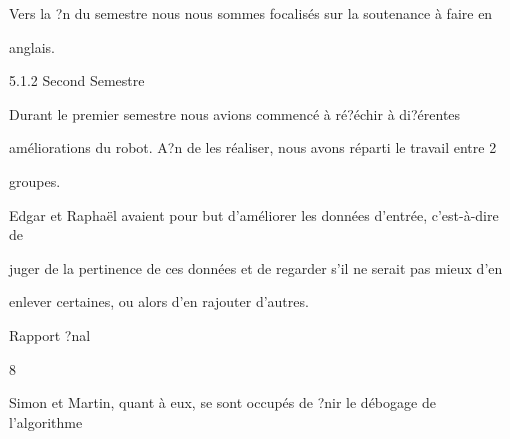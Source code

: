 \documentclass[a4paper,portrait,12pt]{article}
\begin{document}
\begin{flushleft}
Vers la ?n du semestre nous nous sommes focalis\'{e}s sur la soutenance \`{a} faire en
\end{flushleft}


\begin{flushleft}
anglais.
\end{flushleft}





\begin{flushleft}
5.1.2 Second Semestre
\end{flushleft}


\begin{flushleft}
Durant le premier semestre nous avions commenc\'{e} \`{a} r\'{e}?\'{e}chir \`{a} di?\'{e}rentes
\end{flushleft}


\begin{flushleft}
am\'{e}liorations du robot. A?n de les r\'{e}aliser, nous avons r\'{e}parti le travail entre 2
\end{flushleft}


\begin{flushleft}
groupes.
\end{flushleft}


\begin{flushleft}
Edgar et Rapha\"{e}l avaient pour but d'am\'{e}liorer les donn\'{e}es d'entr\'{e}e, c'est-\`{a}-dire de
\end{flushleft}


\begin{flushleft}
juger de la pertinence de ces donn\'{e}es et de regarder s'il ne serait pas mieux d'en
\end{flushleft}


\begin{flushleft}
enlever certaines, ou alors d'en rajouter d'autres.
\end{flushleft}





\begin{flushleft}
\newpage
Rapport ?nal
\end{flushleft}





8





\begin{flushleft}
Simon et Martin, quant \`{a} eux, se sont occup\'{e}s de ?nir le d\'{e}bogage de l'algorithme
\end{flushleft}
\end{document}
